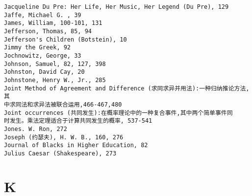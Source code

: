 \begin{verbatim}
Jacqueline Du Pre: Her Life, Her Music, Her Legend (Du Pre), 129
Jaffe, Michael G. , 39
James, William, 100-101, 131
Jefferson, Thomas, 85, 94
Jefferson's Children (Botstein), 10
Jimmy the Greek, 92
Jochnowitz, George, 33
Johnson, Samuel, 82, 127, 398
Johnston, David Cay, 20
Johnstone, Henry W., Jr., 285
Joint Method of Agreement and Difference (求同求异并用法):一种归纳推论方法,其
中求同法和求异法被联合运用,466-467,480
Joint occurrences (共同发生):在概率理论中的一种复合事件,其中两个简单事件同
时发生。乘法定理适合于计算共同发生的概率, 537-541
Jones. W. Ron, 272
Joseph (约瑟夫), H. W. B., 160, 276
Journal of Blacks in Higher Education, 82
Julius Caesar (Shakespeare), 273
\end{verbatim}

\section*{K}
